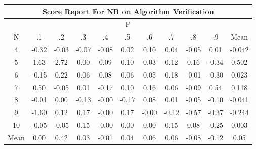 \documentclass[11pt,a4paper]{report}
\begin{document}
\begin{longtable}{ | c || c | c | c | c | c | c | c | c | c || c |}
\hline
\multicolumn{11}{|c|}{ Score Report For NR on Algorithm Verification} \\
\hline
\multicolumn{11}{|c|}{ P } \\
\hline
N & .1 & .2 & .3 & .4 & .5 & .6 & .7 & .8 & .9 & Mean\\
 \hline
 \hline
 \endhead
  4 &  \cellcolor[HTML]{FFF7F7} -0.32 &  \cellcolor[HTML]{FFFFFF} -0.03 &  \cellcolor[HTML]{FFFFFF} -0.07 &  \cellcolor[HTML]{FFFFFF} -0.08 &  \cellcolor[HTML]{FFFFFF} 0.02 &  \cellcolor[HTML]{FFFFFF} 0.10 &  \cellcolor[HTML]{FFFFFF} 0.04 &  \cellcolor[HTML]{FFFFFF} -0.05 &  \cellcolor[HTML]{FFFFFF} 0.01 & -0.042 \\
  5 &  \cellcolor[HTML]{D7D7FF} 1.63 &  \cellcolor[HTML]{B7B7FF} 2.72 &  \cellcolor[HTML]{FFFFFF} 0.00 &  \cellcolor[HTML]{FFFFFF} 0.09 &  \cellcolor[HTML]{FFFFFF} 0.10 &  \cellcolor[HTML]{FFFFFF} 0.03 &  \cellcolor[HTML]{FFFFFF} 0.12 &  \cellcolor[HTML]{F7F7FF} 0.16 &  \cellcolor[HTML]{FFF7F7} -0.34 & 0.502 \\
  6 &  \cellcolor[HTML]{FFFFFF} -0.15 &  \cellcolor[HTML]{F7F7FF} 0.22 &  \cellcolor[HTML]{FFFFFF} 0.06 &  \cellcolor[HTML]{FFFFFF} 0.08 &  \cellcolor[HTML]{FFFFFF} 0.06 &  \cellcolor[HTML]{FFFFFF} 0.05 &  \cellcolor[HTML]{F7F7FF} 0.18 &  \cellcolor[HTML]{FFFFFF} -0.01 &  \cellcolor[HTML]{FFF7F7} -0.30 & 0.023 \\
  7 &  \cellcolor[HTML]{EFEFFF} 0.50 &  \cellcolor[HTML]{FFFFFF} -0.05 &  \cellcolor[HTML]{FFFFFF} 0.01 &  \cellcolor[HTML]{FFF7F7} -0.17 &  \cellcolor[HTML]{FFFFFF} 0.10 &  \cellcolor[HTML]{F7F7FF} 0.16 &  \cellcolor[HTML]{FFFFFF} 0.06 &  \cellcolor[HTML]{FFFFFF} -0.09 &  \cellcolor[HTML]{EFEFFF} 0.54 & 0.118 \\
  8 &  \cellcolor[HTML]{FFFFFF} -0.01 &  \cellcolor[HTML]{FFFFFF} 0.00 &  \cellcolor[HTML]{FFFFFF} -0.13 &  \cellcolor[HTML]{FFFFFF} -0.00 &  \cellcolor[HTML]{FFF7F7} -0.17 &  \cellcolor[HTML]{FFFFFF} 0.08 &  \cellcolor[HTML]{FFFFFF} 0.01 &  \cellcolor[HTML]{FFFFFF} -0.05 &  \cellcolor[HTML]{FFFFFF} -0.10 & -0.041 \\
  9 &  \cellcolor[HTML]{FFD7D7} -1.60 &  \cellcolor[HTML]{FFFFFF} 0.12 &  \cellcolor[HTML]{F7F7FF} 0.17 &  \cellcolor[HTML]{FFFFFF} -0.00 &  \cellcolor[HTML]{F7F7FF} 0.17 &  \cellcolor[HTML]{FFFFFF} -0.00 &  \cellcolor[HTML]{FFFFFF} -0.12 &  \cellcolor[HTML]{FFEFEF} -0.57 &  \cellcolor[HTML]{FFF7F7} -0.37 & -0.244 \\
  10 &  \cellcolor[HTML]{FFFFFF} -0.05 &  \cellcolor[HTML]{FFFFFF} -0.05 &  \cellcolor[HTML]{FFFFFF} 0.15 &  \cellcolor[HTML]{FFFFFF} -0.00 &  \cellcolor[HTML]{FFFFFF} 0.00 &  \cellcolor[HTML]{FFFFFF} 0.00 &  \cellcolor[HTML]{FFFFFF} 0.15 &  \cellcolor[HTML]{FFFFFF} 0.08 &  \cellcolor[HTML]{FFF7F7} -0.25 & 0.003 \\
 \hline
 \hline
Mean &  \cellcolor[HTML]{FFFFFF} 0.00 &  \cellcolor[HTML]{F7F7FF} 0.42 &  \cellcolor[HTML]{FFFFFF} 0.03 &  \cellcolor[HTML]{FFFFFF} -0.01 &  \cellcolor[HTML]{FFFFFF} 0.04 &  \cellcolor[HTML]{FFFFFF} 0.06 &  \cellcolor[HTML]{FFFFFF} 0.06 &  \cellcolor[HTML]{FFFFFF} -0.08 &  \cellcolor[HTML]{FFFFFF} -0.12 &  \cellcolor[HTML]{FFFFFF} 0.05
\end{longtable}
\end{document}
